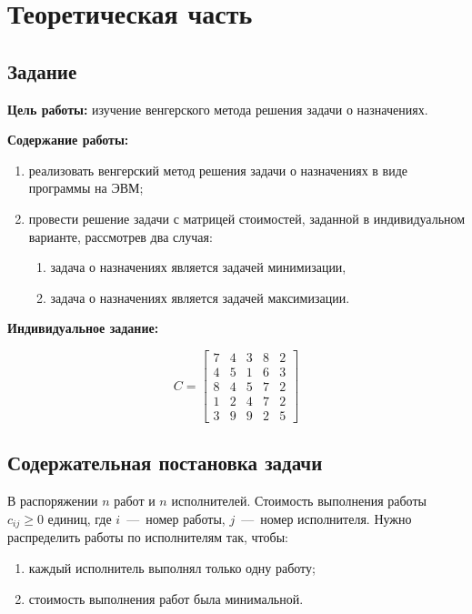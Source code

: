 \chapter{Теоретическая часть}

\section{Задание}

\textbf{Цель работы:} изучение венгерского метода решения задачи о назначениях.

\textbf{Содержание работы:}

\begin{enumerate}
	\item реализовать венгерский метод решения задачи о назначениях в виде программы на ЭВМ;
	\item провести решение задачи с матрицей стоимостей, заданной в индивидуальном варианте, рассмотрев два случая:
	\begin{enumerate}
		\item задача о назначениях является задачей минимизации,
		\item задача о назначениях является задачей максимизации.
	\end{enumerate}
\end{enumerate}

\textbf{Индивидуальное задание:}

\begin{equation}
	C = 
	\begin{bmatrix}
		7 & 4 & 3 & 8 & 2 \\
		4 & 5 & 1 & 6 & 3 \\
		8 & 4 & 5 & 7 & 2 \\
		1 & 2 & 4 & 7 & 2 \\
		3 & 9 & 9 & 2 & 5
	\end{bmatrix}
\end{equation}

\section{Содержательная постановка задачи}

В распоряжении $n$ работ и $n$ исполнителей. Стоимость выполнения работы $c_{ij} \geq 0$ единиц, где $i$~---~номер работы, $j$~---~номер исполнителя. Нужно распределить работы по исполнителям так, чтобы:

\begin{enumerate}
	\item каждый исполнитель выполнял только одну работу;
	\item стоимость выполнения работ была минимальной.
\end{enumerate}

